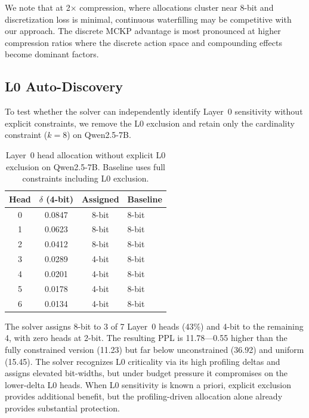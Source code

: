 \documentclass[11pt,a4paper]{article}
\begin{document}
We note that at 2$\times$ compression, where allocations cluster near 8-bit and discretization loss is minimal, continuous waterfilling may be competitive with our approach.
The discrete MCKP advantage is most pronounced at higher compression ratios where the discrete action space and compounding effects become dominant factors.

\subsection{L0 Auto-Discovery}
\label{sec:l0}

To test whether the solver can independently identify Layer~0 sensitivity without explicit constraints, we remove the L0 exclusion and retain only the cardinality constraint ($k{=}8$) on Qwen2.5-7B.

\begin{table}[t]
\centering
\small
\caption{Layer~0 head allocation without explicit L0 exclusion on Qwen2.5-7B. Baseline uses full constraints including L0 exclusion.}
\label{tab:l0_heads}
\begin{tabular}{cccl}
\toprule
\textbf{Head} & \textbf{$\delta$ (4-bit)} & \textbf{Assigned} & \textbf{Baseline} \\
\midrule
0 & 0.0847 & 8-bit & 8-bit \\
1 & 0.0623 & 8-bit & 8-bit \\
2 & 0.0412 & 8-bit & 8-bit \\
3 & 0.0289 & 4-bit & 8-bit \\
4 & 0.0201 & 4-bit & 8-bit \\
5 & 0.0178 & 4-bit & 8-bit \\
6 & 0.0134 & 4-bit & 8-bit \\
\bottomrule
\end{tabular}
\end{table}

The solver assigns 8-bit to 3 of 7 Layer~0 heads (43\%) and 4-bit to the remaining 4, with zero heads at 2-bit.
The resulting PPL is 11.78---0.55 higher than the fully constrained version (11.23) but far below unconstrained (36.92) and uniform (15.45).
The solver recognizes L0 criticality via its high profiling deltas and assigns elevated bit-widths, but under budget pressure it compromises on the lower-delta L0 heads.
When L0 sensitivity is known a priori, explicit exclusion provides additional benefit, but the profiling-driven allocation alone already provides substantial protection.
\end{document}
